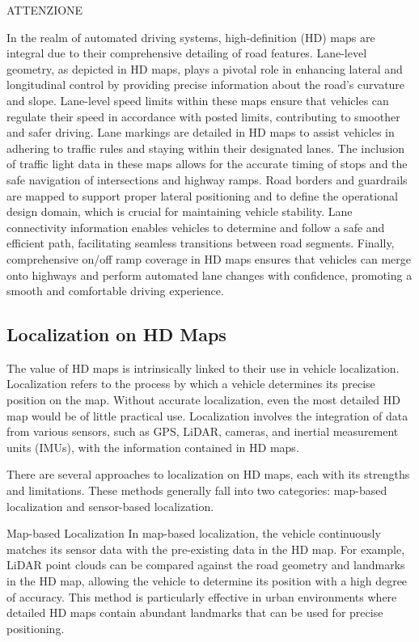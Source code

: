 ATTENZIONE %


In the realm of automated driving systems, high-definition (HD) maps are integral due to their comprehensive detailing of road features. Lane-level geometry, as depicted in HD maps, plays a pivotal role in enhancing lateral and longitudinal control by providing precise information about the road's curvature and slope. Lane-level speed limits within these maps ensure that vehicles can regulate their speed in accordance with posted limits, contributing to smoother and safer driving. Lane markings are detailed in HD maps to assist vehicles in adhering to traffic rules and staying within their designated lanes. The inclusion of traffic light data in these maps allows for the accurate timing of stops and the safe navigation of intersections and highway ramps. Road borders and guardrails are mapped to support proper lateral positioning and to define the operational design domain, which is crucial for maintaining vehicle stability. Lane connectivity information enables vehicles to determine and follow a safe and efficient path, facilitating seamless transitions between road segments. Finally, comprehensive on/off ramp coverage in HD maps ensures that vehicles can merge onto highways and perform automated lane changes with confidence, promoting a smooth and comfortable driving experience.


\subsection{Localization on HD Maps}
The value of HD maps is intrinsically linked to their use in vehicle localization. Localization refers to the process by which a vehicle determines its precise position on the map. Without accurate localization, even the most detailed HD map would be of little practical use. Localization involves the integration of data from various sensors, such as GPS, LiDAR, cameras, and inertial measurement units (IMUs), with the information contained in HD maps.

There are several approaches to localization on HD maps, each with its strengths and limitations. These methods generally fall into two categories: map-based localization and sensor-based localization.

Map-based Localization
In map-based localization, the vehicle continuously matches its sensor data with the pre-existing data in the HD map. For example, LiDAR point clouds can be compared against the road geometry and landmarks in the HD map, allowing the vehicle to determine its position with a high degree of accuracy. This method is particularly effective in urban environments where detailed HD maps contain abundant landmarks that can be used for precise positioning.

